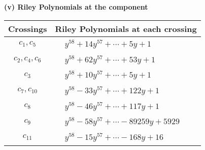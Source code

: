 \documentclass[1p]{elsarticle_modified}
\theoremstyle{definition}
\begin{document}
\newpage\renewcommand{\arraystretch}{1}
\flushleft \textbf{(v) Riley Polynomials at the component}\newline \\
\begin{tabular}{m{50pt}|m{274pt}}
Crossings & \hspace{64pt}Riley Polynomials at each crossing \\
\hline $$\begin{aligned}c_{1},c_{5}\end{aligned}$$&$\begin{aligned}
&y^{58}+14 y^{57}+\cdots+5 y+1
\end{aligned}$\\
\hline $$\begin{aligned}c_{2},c_{4},c_{6}\end{aligned}$$&$\begin{aligned}
&y^{58}+62 y^{57}+\cdots+53 y+1
\end{aligned}$\\
\hline $$\begin{aligned}c_{3}\end{aligned}$$&$\begin{aligned}
&y^{58}+10 y^{57}+\cdots+5 y+1
\end{aligned}$\\
\hline $$\begin{aligned}c_{7},c_{10}\end{aligned}$$&$\begin{aligned}
&y^{58}-33 y^{57}+\cdots+122 y+1
\end{aligned}$\\
\hline $$\begin{aligned}c_{8}\end{aligned}$$&$\begin{aligned}
&y^{58}-46 y^{57}+\cdots+117 y+1
\end{aligned}$\\
\hline $$\begin{aligned}c_{9}\end{aligned}$$&$\begin{aligned}
&y^{58}-58 y^{57}+\cdots-89259 y+5929
\end{aligned}$\\
\hline $$\begin{aligned}c_{11}\end{aligned}$$&$\begin{aligned}
&y^{58}-15 y^{57}+\cdots-168 y+16
\end{aligned}$\\
\hline
\end{tabular}\\~\\
\end{document}
